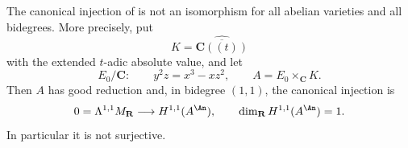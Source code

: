 \begin{proposition}\label{prop:ch18-gjr-cohomology-counterexample}
The canonical injection of \cite[\S1.15]{GJR26} is not an isomorphism for
all abelian varieties and all bidegrees.  More precisely, put
\[
 K=\widehat{\overline{\mathbf C((t))}}
\]
with the extended $t$-adic absolute value, and let
\[
 E_0/\mathbf C:\qquad y^2z=x^3-xz^2,
 \qquad A=E_0\times_{\mathbf C}K .
\]
Then $A$ has good reduction and, in bidegree $(1,1)$, the canonical
injection is
\begin{equation}
 0=\Lambda^{1,1}M_{\mathbf R}
 \longrightarrow H^{1,1}(A^{\An}),
 \qquad
\dim_{\mathbf R}H^{1,1}(A^{\An})=1.
\label{eq:ch18-gjr-cohomology-counterexample}
\end{equation}
In particular it is not surjective.
\end{proposition}
